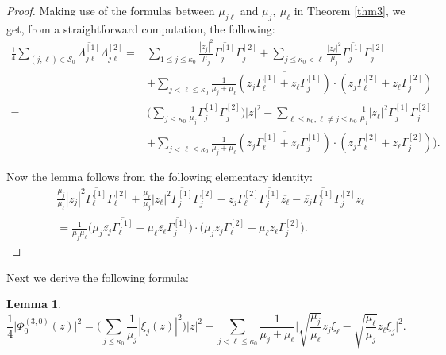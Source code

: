 \documentclass[12pt]{article}
\numberwithin{equation}{section}
\def\ov{\overline}
\newtheorem{lemma}[theorem]{Lemma}
\begin{document}
\begin{proof}
Making use of  the formulas  between $\mu_{j \ell}$ and $\mu_j,\
\mu_\ell$ in Theorem \ref{thm3}, we get, from a straightforward
computation, the following:
\begin{equation*}\begin{split}
\frac{1}{4} \sum\limits_{(j,\ell)\in
\mathcal{S}_0}\ov{\Lambda^{[1]}_{j \ell}}\Lambda^{[2]}_{j \ell}
=&\sum\limits_{1\leq j\leq
\kappa_0}\frac{|z_j|^2}{\mu_j}\ov{\Gamma^{[1]}_{j}}\Gamma^{[2]}_{j
}+\sum\limits_{ j\leq
\kappa_0<\ell}\frac{|z_\ell|^2}{\mu_j}\ov{\Gamma^{[1]}_{j}}\Gamma^{[2]}_{j}\\
&+\sum_{j < \ell \le \kappa_0} \frac{1}{\mu_j+\mu_\ell} \ov{(z_j
\Gamma^{[1]}_\ell + z_\ell \Gamma^{[1]}_j)}\cdot (z_j \Gamma^{[2]}_\ell + z_\ell \Gamma^{[2]}_j)\\
=&\Big( \sum_{j\le \kappa_0} \frac{1}{\mu_j}\ov{\Gamma^{[1]}_{j
}}\Gamma^{[2]}_{j } \Big)\vert z\vert^2 - \underset{\ell \le
\kappa_0, \ell \not=j \le \kappa_0}{\sum} \frac{1}{\mu_j} |z_\ell|^2
\ov{\Gamma^{[1]}_{j}}\Gamma^{[2]}_{j}\\
&+ \sum_{j < \ell \le \kappa_0} \frac{1}{\mu_j+\mu_\ell}
\ov{(z_j\Gamma^{[1]}_{\ell}+z_\ell\Gamma^{[1]}_{j})}\cdot
(z_j\Gamma^{[2]}_{\ell}+z_\ell\Gamma^{[2]}_{j})).
\end{split}\end{equation*}

Now the lemma follows from  the following elementary identity:
\begin{equation*}\begin{split}
& \frac{\mu_j}{\mu_\ell} |z_j
|^2\ov{\Gamma^{[1]}_{\ell}}\Gamma^{[2]}_{\ell} +
\frac{\mu_\ell}{\mu_j} |z_\ell|^2
\ov{\Gamma^{[1]}_{j}}\Gamma^{[2]}_{j} - z_j\Gamma^{[2]}_\ell
\ov{\Gamma^{[1]}_j}\ov{z_\ell} - \ov{z_j}\ov{\Gamma^{[1]}_\ell}
\Gamma^{[2]}_j z_\ell \\& =\frac{1}{\mu_j\mu_\ell}
        \big(\mu_j\ov{z_j}\ov{\Gamma^{[1]}_\ell}-\mu_\ell\ov{z_\ell}\ov{\Gamma^{[1]}_j}\big)
        \cdot \big(\mu_jz_j\Gamma^{[2]}_\ell-\mu_\ell
z_\ell\Gamma^{[2]}_j\big).
\end{split}\end{equation*}  \end{proof}


Next we derive the following formula:


\begin{lemma}\label{30}
\begin{equation}
\label{(2)} \frac{1}{4} \vert \Phi^{(3,0)}_0(z)\vert^2 =
\Big(\sum_{j\le \kappa_0} \frac{1}{\mu_j} |\xi_j(z)|^2 \Big) |z|^2 -
\sum_{j < \ell \le \kappa_0} \frac{1}{\mu_j + \mu_\ell} \Big|
\sqrt{\frac{\mu_j}{\mu_\ell}} z_j \xi_\ell -
\sqrt{\frac{\mu_\ell}{\mu_j}} z_\ell \xi_j\Big|^2.
\end{equation}
\end{lemma}
\end{document}
